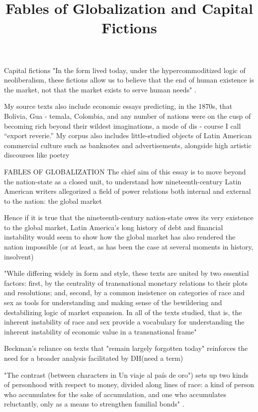 \documentclass[12pt]{article}
\title{Fables of Globalization and Capital Fictions}
\makeatletter
\newcommand\iraggedright{%
	\let\\\@centercr\@rightskip\@flushglue \rightskip\@rightskip
	\leftskip\z@skip}
\makeatother
\begin{document}
	\makeheader
	\iraggedright

Capital fictions
"In the form lived today, under the hypercommoditized logic of neoliberalism, these fictions allow us to believe that the end of human existence is the market, not that the market exists to serve human needs" \cite[ix]{Beckman2012}.

My source texts also 
include economic essays predicting, in the 1870s, that Bolivia, Gua
-
temala, Colombia, and any number of nations were on the cusp of 
becoming rich beyond their wildest imaginations, a mode of dis
-
course I call “export reverie.” My corpus also includes little-studied 
objects of Latin American commercial culture such as banknotes 
and advertisements, alongside high artistic discourses like poetry \cite[x]{Beckman2012}


FABLES OF GLOBALIZATION
The chief aim of this essay is to move beyond the nation-state as a closed unit, to understand
how nineteenth-century Latin American writers allegorized a field of power
relations both internal and external to the nation: the global market \cite[99]{Beckman2013}

Hence if it is true that the nineteenth-century nation-state owes its very existence to the global market, Latin America’s long history of debt and financial instability would seem to show how the global market has also rendered the nation impossible (or at least, as has been the case at several moments in history, insolvent) \cite[100]{Beckman2013}

"While differing widely in form and style, these texts are united by two essential factors: first, by the centrality of transnational monetary relations to their plots and resolutions; and, second, by a common insistence on categories of race and sex as tools for understanding and making sense of the bewildering and destabilizing logic of market expansion. In all of the texts studied, that is, the inherent instability of race and sex provide a vocabulary for understanding the inherent instability of economic value in a transnational frame" \cite[101]{Beckman2013}

Beckman's reliance on texts that "remain largely forgotten today" reinforces the need for a broader analysis facilitated by DH(need a term) 

"The contrast (between characters in Un viaje al país de oro") sets up two kinds of personhood with respect to money, divided along lines of race: a kind of person who accumulates for the sake of accumulation, and one who accumulates reluctantly, only as a means to strengthen familial bonds" \cite[104]{Beckman2013}.
\end{document}
